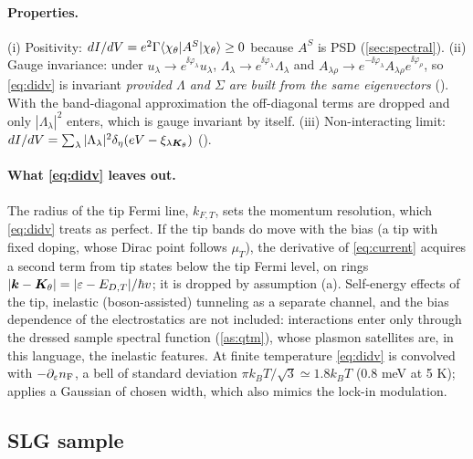 \paragraph{Properties.} (i) Positivity: $dI/dV=e^2\Gamma\langle \chi_\theta|A^S|\chi_\theta\rangle\ge0$ because $A^S$ is PSD
(\cref{sec:spectral}). (ii) Gauge invariance: under $u_\lambda\to e^{\ii\varphi_\lambda}u_\lambda$,
$\Lambda_\lambda\to e^{\ii\varphi_\lambda}\Lambda_\lambda$ and $A_{\lambda\rho}\to e^{-\ii\varphi_\lambda}A_{\lambda\rho}e^{\ii\varphi_\rho}$,
so \cref{eq:didv} is invariant \emph{provided $\Lambda$ and $\Sigma$ are built from the same eigenvectors}
(). With the band-diagonal approximation the off-diagonal terms are dropped and
only $|\Lambda_\lambda|^2$ enters, which is gauge invariant by itself. (iii) Non-interacting limit:
$dI/dV=\sum_\lambda|\Lambda_\lambda|^2\delta_{\eta}(eV-\xi_{\lambda\bm K_\theta})$ ().

\paragraph{What \cref{eq:didv} leaves out.} The radius of the tip Fermi line, $k_{F,T}$, sets the momentum
resolution, which \cref{eq:didv} treats as perfect. If the tip bands do move with the bias (a tip with fixed
doping, whose Dirac point follows $\mu_T$), the derivative of \cref{eq:current} acquires a second term from tip
states below the tip Fermi level, on rings $|\bm k-\bm K_\theta|=|\varepsilon-E_{D,T}|/\hbar v$; it is dropped by
assumption (a). Self-energy effects of the tip, inelastic (boson-assisted) tunneling as a separate channel, and the
bias dependence of the electrostatics are not included: interactions enter only through the dressed sample
spectral function (\cref{as:qtm}), whose plasmon satellites are, in this language, the inelastic features.
At finite temperature \cref{eq:didv} is convolved with $-\partial_\varepsilon n_{\rm F}$, a bell of standard deviation
$\pi k_BT/\sqrt3\simeq1.8k_BT$ (0.8 meV at 5 K);  applies a Gaussian of chosen width,
which also mimics the lock-in modulation.

\subsection{SLG sample}
\label{sec:qtmslg}

